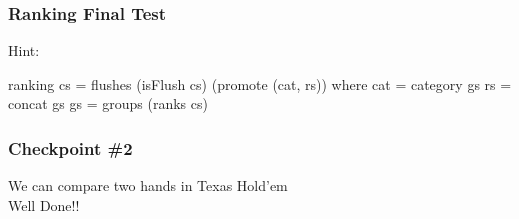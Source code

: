 \documentclass[11pt,xcolor={dvipsnames}]{beamer}
\newcommand{\vs}{\vspace{1em}}
\begin{document}
\begin{frame}[fragile]
\frametitle{Ranking Final Test}
Hint:
\begin{haskell}
ranking cs = flushes (isFlush cs) (promote (cat, rs))
where
cat = category gs
rs  = concat   gs
gs  = groups (ranks cs)
\end{haskell}
\end{frame}
\begin{frame}
\frametitle{Checkpoint \#2}
\begin{center}
We can compare two hands in Texas Hold'em\\
\vs
\Large{Well Done!!}
\end{center}
\end{frame}
\end{document}
